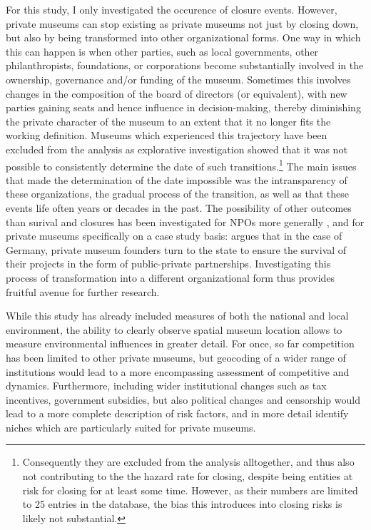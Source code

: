 \documentclass[12pt]{article}
\begin{document}
For this study, I only investigated the occurence of closure events.
However, private museums can stop existing as private museums not just by closing down, but also by being transformed into other organizational forms.
One way in which this can happen is when other parties, such as local governments, other philanthropists, foundations, or corporations become substantially involved in the ownership, governance and/or funding of the museum.
Sometimes this involves changes in the composition of the board of directors (or equivalent), with new parties gaining seats and hence influence in decision-making, thereby diminishing the private character of the museum to an extent that it no longer fits the working definition.
Museums which experienced this trajectory have been excluded from the analysis as explorative investigation showed that it was not possible to consistently determine the date of such transitions.\footnote{Consequently they are excluded from the analysis alltogether, and thus also not contributing to the the hazard rate for closing, despite being entities at risk for closing for at least some time. However, as their numbers are limited to 25 entries in the database, the bias this introduces into closing risks is likely not substantial.}
The main issues that made the determination of the date impossible was the intransparency of these organizations, the gradual process of the transition, as well as that these events life often years or decades in the past.
The possibility of other outcomes than surival and closures has been investigated for NPOs more generally
\parencite{Searing_2020_zombies,HernandezOrtiz_2022_discontinuity,Helmig_Ingerfurth_Pinz_2013_nonprofit}, and for private museums specifically on a case study basis: 
\textcite{Walker_2019_collector} argues that in the case of Germany, private museum founders turn to the state to ensure the survival of their projects in the form of public-private partnerships.
Investigating this process of transformation into a different organizational form thus provides fruitful avenue for further research. 


While this study has already included measures of both the national and local environment, the ability to clearly observe spatial museum location allows to measure environmental influences in greater detail.
For once, so far competition has been limited to other private museums, but geocoding of a wider range of institutions would lead to a more encompassing assessment of competitive and dynamics.
Furthermore, including wider institutional changes such as tax incentives, government subsidies, but also political changes and censorship would lead to a more complete description of risk factors, and in more detail identify niches which are particularly suited for private museums.






\begin{sloppypar}
\printbibliography
\end{sloppypar}
\end{document}

